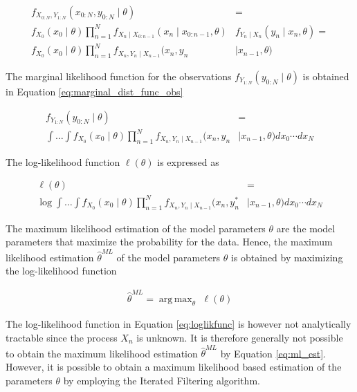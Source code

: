 \documentclass[twoside,openright]{report}
\DeclareMathOperator*{\argmax}{arg\,max}
\begin{document}
\begin{align}
    f_{X_{0:N}, Y_{1:N}}(x_{0:N}, y_{0:N} \mid \theta) &= \\ f_{X_0}(x_0 \mid \theta) \prod_{n = 1}^{N} f_{X_n \mid X_{0:n-1}}(x_n \mid x_{0:n-1}, \theta) & f_{Y_n \mid X_{n}}(y_n \mid x_{n}, \theta)  = \\
    f_{X_0}(x_0 \mid \theta) \prod_{n = 1}^{N} f_{X_n, Y_n \mid X_{n-1}}(x_n, y_n & \mid x_{n-1}, \theta)    
\end{align}

The marginal likelihood function for the observations $f_{Y_{1:N}}(y_{0:N} \mid \theta)$ is obtained in Equation \ref{eq:marginal_dist_func_obs} 


\begin{align} \label{eq:marginal_dist_func_obs}
    f_{Y_{1:N}}(y_{0:N} \mid \theta) &= \\ \int \ldots \int f_{X_0}(x_0 \mid \theta) \prod_{n = 1}^{N}  f_{X_n, Y_n \mid X_{n-1}}(x_n, y_n & \mid x_{n-1}, \theta)  dx_{0} \cdots dx_{N} \nonumber
\end{align}

The log-likelihood function $\ell (\theta)$ is expressed as

\begin{align} \label{eq:loglikfunc}
    \ell (\theta) &= \\ \log \int \ldots \int f_{X_0}(x_0 \mid \theta) \prod_{n = 1}^{N}  f_{X_n, Y_n \mid X_{n-1}}(x_n, y_{n}^{*} & \mid x_{n-1}, \theta)  dx_{0} \cdots dx_{N} \nonumber
\end{align}

The maximum likelihood estimation of the model parameters $\theta$ are the model parameters that maximize the probability for the  data. Hence, the maximum likelihood estimation $\hat{\theta}^{ML}$ of the model parameters $\theta$ is obtained by maximizing the log-likelihood function

\begin{align} \label{eq:ml_est}
    \hat{\theta}^{ML} = \argmax_{\theta} \,\, \ell (\theta)
\end{align} 

The log-likelihood function in Equation \ref{eq:loglikfunc} is however not analytically tractable since the process $X_{n}$ is unknown.  It is therefore  generally not possible to obtain the maximum likelihood estimation $\hat{\theta}^{ML}$ by Equation \ref{eq:ml_est}.  However, it is possible to obtain a maximum likelihood based estimation of the parameters $\theta$ by employing the Iterated Filtering algorithm. 
\end{document}
